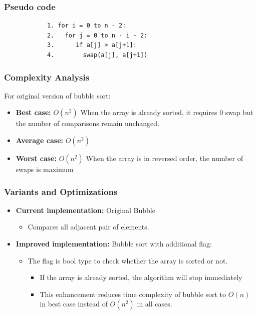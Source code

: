     \subsubsection{Pseudo code} 
        \begin{verbatim}
            1. for i = 0 to n - 2:
            2.   for j = 0 to n - i - 2:
            3.      if a[j] > a[j+1]:
            4.        swap(a[j], a[j+1])
        \end{verbatim}


    \subsubsection{Complexity Analysis}
        For original version of bubble sort:
        \begin{itemize}
            \item \textbf{Best case:} $O(n^2)$
            \subitem When the array is already sorted, it requires 0 swap but the number of comparisons remain unchanged.
            \item \textbf{Average case:} $O(n^2)$
            \item \textbf{Worst case:} $O(n^2)$
            \subitem When the array is in reversed order, the number of swaps is maximum
        \end{itemize}
    

    \subsubsection{Variants and Optimizations} 
    \begin{itemize}
        \item \textbf{Current implementation:} Original Bubble 
            \begin{itemize}
                \item Compares all adjacent pair of elements.
            \end{itemize}
        \item \textbf{Improved implementation:} Bubble sort with additional flag:
         \begin{itemize}
            \item The flag is bool type to check whether the array is sorted or not.
            \begin{itemize}
                \item If the array is already sorted, the algorithm will stop immediately
                \item This enhancement reduces time complexity of bubble sort to $O(n)$ in best case instead of $O(n^2) $ in all cases.
            \end{itemize}
         \end{itemize}
    \end{itemize}

